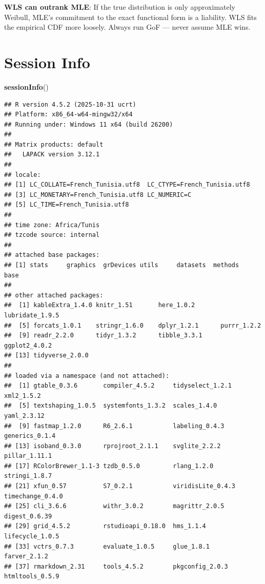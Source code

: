 \documentclass[
]{article}
\newenvironment{Shaded}{\begin{snugshade}}{\end{snugshade}}
\newcommand{\FunctionTok}[1]{\textcolor[rgb]{0.13,0.29,0.53}{\textbf{#1}}}
\newcommand{\NormalTok}[1]{#1}
\begin{document}
\textbf{WLS can outrank MLE}: If the true distribution is only
approximately Weibull, MLE's commitment to the exact functional form is
a liability. WLS fits the empirical CDF more loosely. Always run GoF ---
never assume MLE wins.

\newpage

\section{Session Info}\label{session-info}

\begin{Shaded}
\begin{Highlighting}[]
\FunctionTok{sessionInfo}\NormalTok{()}
\end{Highlighting}
\end{Shaded}

\begin{verbatim}
## R version 4.5.2 (2025-10-31 ucrt)
## Platform: x86_64-w64-mingw32/x64
## Running under: Windows 11 x64 (build 26200)
## 
## Matrix products: default
##   LAPACK version 3.12.1
## 
## locale:
## [1] LC_COLLATE=French_Tunisia.utf8  LC_CTYPE=French_Tunisia.utf8   
## [3] LC_MONETARY=French_Tunisia.utf8 LC_NUMERIC=C                   
## [5] LC_TIME=French_Tunisia.utf8    
## 
## time zone: Africa/Tunis
## tzcode source: internal
## 
## attached base packages:
## [1] stats     graphics  grDevices utils     datasets  methods   base     
## 
## other attached packages:
##  [1] kableExtra_1.4.0 knitr_1.51       here_1.0.2       lubridate_1.9.5 
##  [5] forcats_1.0.1    stringr_1.6.0    dplyr_1.2.1      purrr_1.2.2     
##  [9] readr_2.2.0      tidyr_1.3.2      tibble_3.3.1     ggplot2_4.0.2   
## [13] tidyverse_2.0.0 
## 
## loaded via a namespace (and not attached):
##  [1] gtable_0.3.6       compiler_4.5.2     tidyselect_1.2.1   xml2_1.5.2        
##  [5] textshaping_1.0.5  systemfonts_1.3.2  scales_1.4.0       yaml_2.3.12       
##  [9] fastmap_1.2.0      R6_2.6.1           labeling_0.4.3     generics_0.1.4    
## [13] isoband_0.3.0      rprojroot_2.1.1    svglite_2.2.2      pillar_1.11.1     
## [17] RColorBrewer_1.1-3 tzdb_0.5.0         rlang_1.2.0        stringi_1.8.7     
## [21] xfun_0.57          S7_0.2.1           viridisLite_0.4.3  timechange_0.4.0  
## [25] cli_3.6.6          withr_3.0.2        magrittr_2.0.5     digest_0.6.39     
## [29] grid_4.5.2         rstudioapi_0.18.0  hms_1.1.4          lifecycle_1.0.5   
## [33] vctrs_0.7.3        evaluate_1.0.5     glue_1.8.1         farver_2.1.2      
## [37] rmarkdown_2.31     tools_4.5.2        pkgconfig_2.0.3    htmltools_0.5.9
\end{verbatim}
\end{document}
